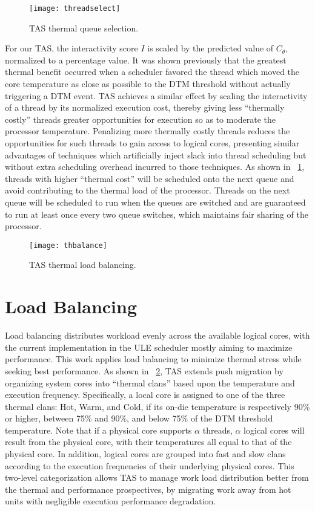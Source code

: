 \begin{figure}[t]
  \centering
  \texttt{[image: threadselect]}
  \caption{TAS thermal queue selection.}
  \label{fig:tasselect}
\end{figure}

For our TAS, the interactivity score $I$ is scaled by the predicted
value of $C_{\theta}$, normalized to a percentage value.  It was shown
previously \cite{Zhou2010b} that the greatest thermal benefit occurred
when a scheduler favored the thread which moved the core temperature as
close as possible to the DTM threshold without actually triggering a DTM
event.  TAS achieves a similar effect by scaling the interactivity of a
thread by its normalized execution cost, thereby giving less ``thermally
costly'' threads greater opportunities for execution so as to moderate
the processor temperature.  Penalizing more thermally costly threads
reduces the opportunities for such threads to gain access to logical
cores, presenting similar advantages of techniques which artificially
inject slack into thread scheduling but without extra scheduling
overhead incurred to those techniques.  As shown in
\figurename~\ref{fig:tasselect}, threads with higher ``thermal cost''
will be scheduled onto the next queue and avoid contributing to the
thermal load of the processor.  Threads on the next queue will be
scheduled to run when the queues are switched and are guaranteed to run
at least once every two queue switches, which maintains fair sharing of
the processor.

\begin{figure}[t]
  \centering
  \texttt{[image: thbalance]}
  \caption{TAS thermal load balancing.}
  \label{fig:tasbalance}
\end{figure}

\section{Load Balancing}
\label{sec:loadbalance} 
Load balancing distributes workload evenly across the available logical
cores, with the current implementation in the ULE scheduler mostly
aiming to maximize performance.  This work applies load balancing to
minimize thermal stress while seeking best performance.  As shown in
\figurename~\ref{fig:tasbalance}, TAS extends push migration by
organizing system cores into ``thermal clans'' based upon the
temperature and execution frequency.  Specifically, a local core is
assigned to one of the three thermal clans: Hot, Warm, and Cold, if its
on-die temperature is respectively 90\% or higher, between 75\% and
90\%, and below 75\% of the DTM threshold temperature.  Note that if a
physical core supports $\alpha$ threads, $\alpha$ logical cores will
result from the physical core, with their temperatures all equal to that
of the physical core.  In addition, logical cores are grouped into fast
and slow clans according to the execution frequencies of their
underlying physical cores.  This two-level categorization allows TAS to
manage work load distribution better from the thermal and performance
prospectives, by migrating work away from hot units with negligible
execution performance degradation.

